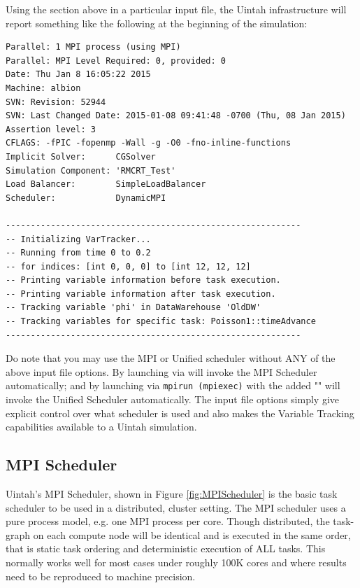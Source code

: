 \noindent Using the  section above in a particular input file,
the Uintah infrastructure will report something like the following at the
beginning of the simulation:

\begin{Verbatim}[fontsize=\footnotesize]
Parallel: 1 MPI process (using MPI)
Parallel: MPI Level Required: 0, provided: 0
Date: Thu Jan 8 16:05:22 2015
Machine: albion
SVN: Revision: 52944
SVN: Last Changed Date: 2015-01-08 09:41:48 -0700 (Thu, 08 Jan 2015)
Assertion level: 3
CFLAGS: -fPIC -fopenmp -Wall -g -O0 -fno-inline-functions
Implicit Solver:      CGSolver
Simulation Component: 'RMCRT_Test'
Load Balancer:        SimpleLoadBalancer
Scheduler:            DynamicMPI

-----------------------------------------------------------
-- Initializing VarTracker...
-- Running from time 0 to 0.2
-- for indices: [int 0, 0, 0] to [int 12, 12, 12]
-- Printing variable information before task execution.
-- Printing variable information after task execution.
-- Tracking variable 'phi' in DataWarehouse 'OldDW'
-- Tracking variables for specific task: Poisson1::timeAdvance
-----------------------------------------------------------
\end{Verbatim}

Do note that you may use the MPI or Unified scheduler without ANY of the
above input file options. By launching  via  will
invoke the MPI Scheduler automatically; and by launching  via
\texttt{mpirun (mpiexec)} with the added "" will invoke the
Unified Scheduler automatically. The input file options simply give
explicit control over what scheduler is used and also makes the Variable
Tracking capabilities available to a Uintah simulation.

\subsection{MPI Scheduler} \label{Sec:MPIScheduler}
Uintah's MPI Scheduler, shown in Figure \ref{fig:MPIScheduler} is the basic
task scheduler to be used in a distributed, cluster setting. The MPI scheduler
uses a pure process model, e.g. one MPI process per core. Though distributed, the task-graph on each compute node will be identical and is executed in the same order, that is static task ordering and deterministic execution of ALL tasks. This normally
works well for most cases under roughly 100K cores and where results need to be
reproduced to machine precision.

